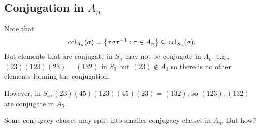 \documentclass[10pt]{article}
\begin{document}
      \subsection{Conjugation in $A_n$}

      Note that 
      \[
          \operatorname{ccl}_{A_n}(\sigma)=\left\{ \tau \sigma\tau^{-1}:\tau\in A_n \right\} \subseteq \operatorname{ccl}_{S_n}(\sigma)
      .\]
      But elements that are conjugate in $S_n$ may not be conjugate in $A_n$. e.g., $ (23)(123)(23)=(132) $ in $S_3$ but $ (23)\notin A_3 $ so there is no other elements forming the conjugation.

      However, in $S_5, (23)(45)(123)(45)(23)=(132)$, so $ (123),(132) $ are conjugate in $A_5$.

      Some conjugacy classes may split into smaller conjugacy classes in $A_n$. But how?
\end{document}
